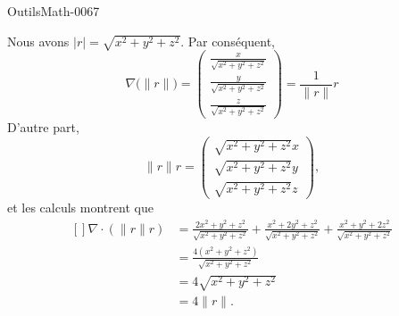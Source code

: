 
\begin{corrige}{OutilsMath-0067}

    Nous avons $| r |=\sqrt{x^2+y^2+z^2}$. Par conséquent,
    \begin{equation}
        \nabla\big( \| r \| \big)=\begin{pmatrix}
            \frac{ x }{ \sqrt{x^2+y^2+z^2} }    \\ 
            \frac{ y }{ \sqrt{x^2+y^2+z^2} }    \\ 
            \frac{ z }{ \sqrt{x^2+y^2+z^2} }    
        \end{pmatrix}=\frac{1}{ \| r \| } r
    \end{equation}
    D'autre part,
    \begin{equation}
        \| r \|r=\begin{pmatrix}
            \sqrt{x^2+y^2+z^2}x    \\ 
            \sqrt{x^2+y^2+z^2}y    \\ 
            \sqrt{x^2+y^2+z^2}z   
        \end{pmatrix},
    \end{equation}
    et les calculs montrent que
    \begin{equation}
        \begin{aligned}[]
            \nabla\cdot(\| r \|r)&=\frac{ 2x^2+y^2+z^2 }{ \sqrt{x^2+y^2+z^2} }+\frac{ x^2+2y^2+z^2 }{ \sqrt{x^2+y^2+z^2} }+\frac{ x^2+y^2+2z^2 }{ \sqrt{x^2+y^2+z^2} }\\
            &=\frac{ 4(x^2+y^2+z^2) }{ \sqrt{x^2+y^2+z^2} }\\
            &=4\sqrt{x^2+y^2+z^2}\\
            &=4\| r \|.
        \end{aligned}
    \end{equation}

\end{corrige}

